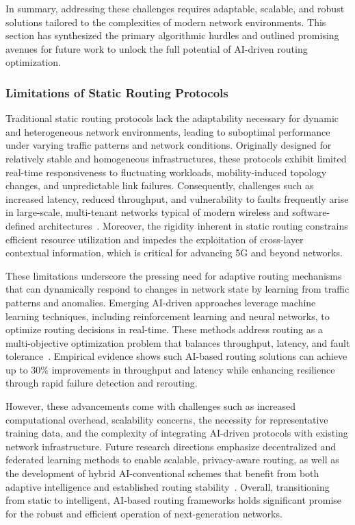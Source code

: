 \documentclass[sigconf]{acmart}
\begin{document}
In summary, addressing these challenges requires adaptable, scalable, and robust solutions tailored to the complexities of modern network environments. This section has synthesized the primary algorithmic hurdles and outlined promising avenues for future work to unlock the full potential of AI-driven routing optimization.

\subsubsection{Limitations of Static Routing Protocols}

Traditional static routing protocols lack the adaptability necessary for dynamic and heterogeneous network environments, leading to suboptimal performance under varying traffic patterns and network conditions. Originally designed for relatively stable and homogeneous infrastructures, these protocols exhibit limited real-time responsiveness to fluctuating workloads, mobility-induced topology changes, and unpredictable link failures. Consequently, challenges such as increased latency, reduced throughput, and vulnerability to faults frequently arise in large-scale, multi-tenant networks typical of modern wireless and software-defined architectures~\cite{ref53}. Moreover, the rigidity inherent in static routing constrains efficient resource utilization and impedes the exploitation of cross-layer contextual information, which is critical for advancing 5G and beyond networks.

These limitations underscore the pressing need for adaptive routing mechanisms that can dynamically respond to changes in network state by learning from traffic patterns and anomalies. Emerging AI-driven approaches leverage machine learning techniques, including reinforcement learning and neural networks, to optimize routing decisions in real-time. These methods address routing as a multi-objective optimization problem that balances throughput, latency, and fault tolerance~\cite{ref53}. Empirical evidence shows such AI-based routing solutions can achieve up to 30\% improvements in throughput and latency while enhancing resilience through rapid failure detection and rerouting. 

However, these advancements come with challenges such as increased computational overhead, scalability concerns, the necessity for representative training data, and the complexity of integrating AI-driven protocols with existing network infrastructure. Future research directions emphasize decentralized and federated learning methods to enable scalable, privacy-aware routing, as well as the development of hybrid AI-conventional schemes that benefit from both adaptive intelligence and established routing stability~\cite{ref53}. Overall, transitioning from static to intelligent, AI-based routing frameworks holds significant promise for the robust and efficient operation of next-generation networks.
\end{document}
